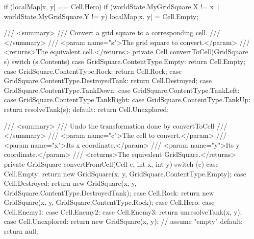 \documentclass[11pt]{article}
\begin{document}
\begin{code}
{{{{{                    if (localMap[x, y] == Cell.Hero)
                    {
                        if (worldState.MyGridSquare.X != x || worldState.MyGridSquare.Y != y)
                        {
                            localMap[x, y] = Cell.Empty;
                        }
                    }

                }
            }
        }

        /// <summary>
        /// Convert a grid square to a corresponding cell.
        /// </summary>
        /// <param name="s">The grid square to convert.</param>
        /// <returns>The equivalent cell.</returns>
        private Cell convertToCell(GridSquare s)
        {
            switch (s.Contents)
            {
                case GridSquare.ContentType.Empty:
                    return Cell.Empty;
                case GridSquare.ContentType.Rock:
                    return Cell.Rock;
                case GridSquare.ContentType.DestroyedTank:
                    return Cell.Destroyed;
                case GridSquare.ContentType.TankDown:
                case GridSquare.ContentType.TankLeft:
                case GridSquare.ContentType.TankRight:
                case GridSquare.ContentType.TankUp:
                    return resolveTank(s);
                default:
                    return Cell.Unexplored;
            }
        }

        /// <summary>
        /// Undo the transformation done by convertToCell
        /// </summary>
        /// <param name="c">The cell to convert.</param>
        /// <param name="x">Its x coordinate.</param>
        /// <param name="y">Its y coordinate.</param>
        /// <returns>The equivalent GridSquare.</returns>
        private GridSquare convertFromCell(Cell c, int x, int y)
        {
            switch (c)
            {
                case Cell.Empty:
                    return new GridSquare(x, y, GridSquare.ContentType.Empty);
                case Cell.Destroyed:
                    return new GridSquare(x, y, GridSquare.ContentType.DestroyedTank);
                case Cell.Rock:
                    return new GridSquare(x, y, GridSquare.ContentType.Rock);
                case Cell.Hero:
                case Cell.Enemy1:
                case Cell.Enemy2:
                case Cell.Enemy3:
                    return unresolveTank(x, y);
                case Cell.Unexplored:
                    return new GridSquare(x, y); // assume "empty"
                default:
                    return null;
            }
        }

}}
\end{code}
\end{document}
